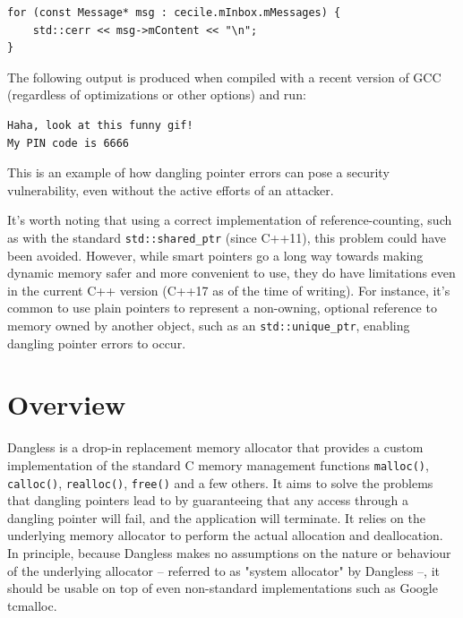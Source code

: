 \begin{lstlisting}
for (const Message* msg : cecile.mInbox.mMessages) {
	std::cerr << msg->mContent << "\n";
}
\end{lstlisting}

The following output is produced when compiled with a recent version of GCC (regardless of optimizations or other options) and run:

\begin{verbatim}
Haha, look at this funny gif!	
My PIN code is 6666
\end{verbatim}

This is an example of how dangling pointer errors can pose a security vulnerability, even without the active efforts of an attacker.

It's worth noting that using a correct implementation of reference-counting, such as with the standard \lstinline!std::shared_ptr! (since C++11), this problem could have been avoided. However, while smart pointers go a long way towards making dynamic memory safer and more convenient to use, they do have limitations even in the current C++ version (C++17 as of the time of writing). For instance, it's common to use plain pointers to represent a non-owning, optional reference to memory owned by another object, such as an \lstinline!std::unique_ptr!, enabling dangling pointer errors to occur.

\section{Overview}



Dangless is a drop-in replacement memory allocator that provides a custom implementation of the standard C memory management functions \lstinline!malloc()!, \lstinline!calloc()!, \lstinline!realloc()!, \lstinline!free()! and a few others. It aims to solve the problems that dangling pointers lead to by guaranteeing that any access through a dangling pointer will fail, and the application will terminate. It relies on the underlying memory allocator to perform the actual allocation and deallocation. In principle, because Dangless makes no assumptions on the nature or behaviour of the underlying allocator -- referred to as "system allocator" by Dangless --, it should be usable on top of even non-standard implementations such as Google tcmalloc.

